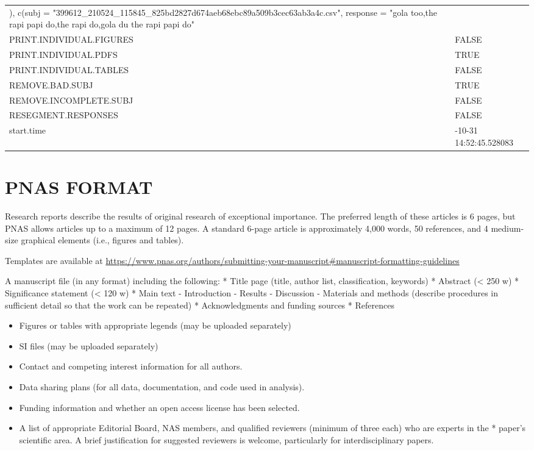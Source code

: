 \documentclass[
]{article}
\providecommand{\tightlist}{%
  \setlength{\itemsep}{0pt}\setlength{\parskip}{0pt}}
\begin{document}
\begin{longtable}[t]{>{\raggedright\arraybackslash}p{20em}>{\raggedright\arraybackslash}p{30em}}
), c(subj = "399612\_210524\_115845\_825bd2827d674aeb68ebc89a509b3cec63ab3a4c.csv", response = "gola too,the rapi papi do,the rapi do,gola du the rapi papi do"\\
\addlinespace
PRINT.INDIVIDUAL.FIGURES & FALSE\\
PRINT.INDIVIDUAL.PDFS & TRUE\\
PRINT.INDIVIDUAL.TABLES & FALSE\\
REMOVE.BAD.SUBJ & TRUE\\
REMOVE.INCOMPLETE.SUBJ & FALSE\\
\addlinespace
RESEGMENT.RESPONSES & FALSE\\
start.time & 2024-10-31 14:52:45.528083\\
\bottomrule
\end{longtable}

\clearpage

\section{PNAS FORMAT}\label{pnas-format}

Research reports describe the results of original research of
exceptional importance. The preferred length of these articles is 6
pages, but PNAS allows articles up to a maximum of 12 pages. A standard
6-page article is approximately 4,000 words, 50 references, and 4
medium-size graphical elements (i.e., figures and tables).

Templates are available at
\url{https://www.pnas.org/authors/submitting-your-manuscript\#manuscript-formatting-guidelines}

A manuscript file (in any format) including the following: * Title page
(title, author list, classification, keywords) * Abstract (\textless{}
250 w) * Significance statement (\textless{} 120 w) * Main text -
Introduction - Results - Discussion - Materials and methods (describe
procedures in sufficient detail so that the work can be repeated) *
Acknowledgments and funding sources * References

\begin{itemize}
\tightlist
\item
  Figures or tables with appropriate legends (may be uploaded
  separately)
\item
  SI files (may be uploaded separately)
\item
  Contact and competing interest information for all authors.
\item
  Data sharing plans (for all data, documentation, and code used in
  analysis).
\item
  Funding information and whether an open access license has been
  selected.
\item
  A list of appropriate Editorial Board, NAS members, and qualified
  reviewers (minimum of three each) who are experts in the * paper's
  scientific area. A brief justification for suggested reviewers is
  welcome, particularly for interdisciplinary papers.
\end{itemize}
\end{document}
